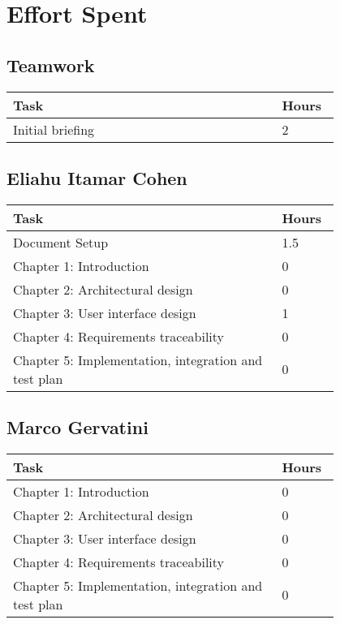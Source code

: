 \chapter{Effort Spent}
\section{Teamwork}
\begin{center}
    \begin{tabular}{@{}p{0.7\linewidth} p{0.1\linewidth}@{}}
        \hline
        \textbf{Task} & \textbf{Hours} \\ \hline
        Initial briefing & 2 \\ \hline
    \end{tabular}
\end{center}

\section{Eliahu Itamar Cohen}
\begin{center}
    \begin{tabular}{@{}p{0.7\linewidth} p{0.1\linewidth}@{}}
        \hline
        \textbf{Task} & \textbf{Hours} \\ \hline
        Document Setup & 1.5 \\ \hline
        Chapter 1: Introduction & 0 \\ \hline
        Chapter 2: Architectural design & 0 \\ \hline
        Chapter 3: User interface design & 1 \\ \hline
        Chapter 4: Requirements traceability & 0 \\ \hline
        Chapter 5: Implementation, integration and test plan & 0 \\ \hline
     
    \end{tabular}
\end{center}

\section{Marco Gervatini}
\begin{center}
	\begin{tabular}{@{}p{0.7\linewidth} p{0.1\linewidth}@{}}
		\hline
		\textbf{Task} & \textbf{Hours} \\ \hline
             Chapter 1: Introduction & 0 \\ \hline
             Chapter 2: Architectural design & 0 \\ \hline
             Chapter 3: User interface design & 0 \\ \hline
             Chapter 4: Requirements traceability & 0 \\ \hline
             Chapter 5: Implementation, integration and test plan & 0 \\ \hline
	\end{tabular}
\end{center}

